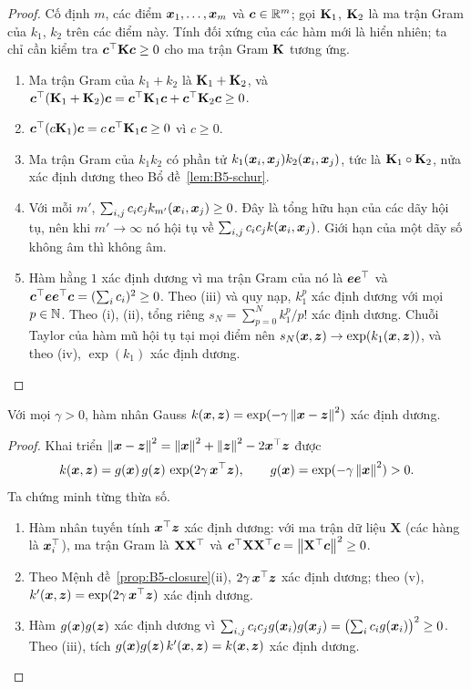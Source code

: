 \begin{proof}
Cố định $m$, các điểm $\bm{x}_1, \dots, \bm{x}_m$ và $\bm{c} \in \mathbb{R}^m$; gọi $\mathbf{K}_1$, $\mathbf{K}_2$ là ma trận Gram
của $k_1$, $k_2$ trên các điểm này. Tính đối xứng của các hàm mới là hiển nhiên; ta chỉ cần
kiểm tra $\bm{c}^{\top}\mathbf{K}\bm{c} \ge 0$ cho ma trận Gram $\mathbf{K}$ tương ứng.
\begin{enumerate}
  \item[(i)] Ma trận Gram của $k_1 + k_2$ là $\mathbf{K}_1 + \mathbf{K}_2$, và
        $\bm{c}^{\top}(\mathbf{K}_1 + \mathbf{K}_2)\bm{c} = \bm{c}^{\top}\mathbf{K}_1\bm{c} + \bm{c}^{\top}\mathbf{K}_2\bm{c} \ge 0$.
  \item[(ii)] $\bm{c}^{\top}(c\mathbf{K}_1)\bm{c} = c\,\bm{c}^{\top}\mathbf{K}_1\bm{c} \ge 0$ vì $c \ge 0$.
  \item[(iii)] Ma trận Gram của $k_1 k_2$ có phần tử $k_1(\bm{x}_i, \bm{x}_j)k_2(\bm{x}_i, \bm{x}_j)$, tức là
        $\mathbf{K}_1 \circ \mathbf{K}_2$, nửa xác định dương theo Bổ đề~\ref{lem:B5-schur}.
  \item[(iv)] Với mỗi $m'$, $\sum_{i,j} c_i c_j k_{m'}(\bm{x}_i, \bm{x}_j) \ge 0$. Đây là tổng hữu hạn
        của các dãy hội tụ, nên khi $m' \to \infty$ nó hội tụ về $\sum_{i,j} c_i c_j k(\bm{x}_i, \bm{x}_j)$.
        Giới hạn của một dãy số không âm thì không âm.
  \item[(v)] Hàm hằng $1$ xác định dương vì ma trận Gram của nó là $\bm{e}\bm{e}^{\top}$ và
        $\bm{c}^{\top}\bm{e}\bm{e}^{\top}\bm{c} = (\sum_i c_i)^2 \ge 0$. Theo (iii) và quy nạp, $k_1^p$ xác định dương
        với mọi $p \in \mathbb{N}$. Theo (i), (ii), tổng riêng $s_N = \sum_{p=0}^N k_1^p / p!$ xác định dương.
        Chuỗi Taylor của hàm mũ hội tụ tại mọi điểm nên $s_N(\bm{x}, \bm{z}) \to \exp(k_1(\bm{x}, \bm{z}))$,
        và theo (iv), $\exp(k_1)$ xác định dương. \qedhere
\end{enumerate}
\end{proof}

\begin{corollary}\label{cor:B5-gauss}
Với mọi $\gamma > 0$, hàm nhân Gauss $k(\bm{x}, \bm{z}) = \exp(-\gamma\left\lVert \bm{x} - \bm{z} \right\rVert^2)$ xác định dương.
\end{corollary}

\begin{proof}
Khai triển $\left\lVert \bm{x} - \bm{z} \right\rVert^2 = \left\lVert \bm{x} \right\rVert^2 + \left\lVert \bm{z} \right\rVert^2 - 2\bm{x}^{\top}\bm{z}$ được
\[
  k(\bm{x}, \bm{z}) = g(\bm{x})\, g(\bm{z})\, \exp(2\gamma\,\bm{x}^{\top}\bm{z}), \qquad g(\bm{x}) = \exp(-\gamma\left\lVert \bm{x} \right\rVert^2) > 0.
\]
Ta chứng minh từng thừa số.
\begin{enumerate}
  \item Hàm nhân tuyến tính $\bm{x}^{\top}\bm{z}$ xác định dương: với ma trận dữ liệu $\mathbf{X}$ (các hàng là
        $\bm{x}_i^{\top}$), ma trận Gram là $\mathbf{X}\mathbf{X}^{\top}$ và
        $\bm{c}^{\top}\mathbf{X}\mathbf{X}^{\top}\bm{c} = \left\lVert \mathbf{X}^{\top}\bm{c} \right\rVert^2 \ge 0$.
  \item Theo Mệnh đề~\ref{prop:B5-closure}(ii), $2\gamma\,\bm{x}^{\top}\bm{z}$ xác định dương; theo (v),
        $k'(\bm{x}, \bm{z}) = \exp(2\gamma\,\bm{x}^{\top}\bm{z})$ xác định dương.
  \item Hàm $g(\bm{x})g(\bm{z})$ xác định dương vì
        $\sum_{i,j} c_i c_j g(\bm{x}_i) g(\bm{x}_j) = \bigl(\sum_i c_i g(\bm{x}_i)\bigr)^2 \ge 0$.
        Theo (iii), tích $g(\bm{x})g(\bm{z})\,k'(\bm{x}, \bm{z}) = k(\bm{x}, \bm{z})$ xác định dương. \qedhere
\end{enumerate}
\end{proof}

